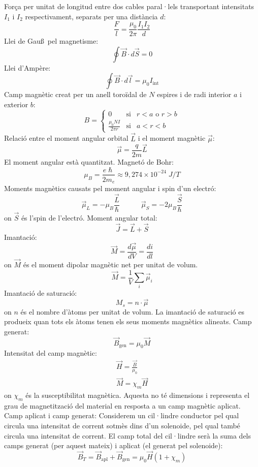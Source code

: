 \documentclass[../../../main.tex]{subfiles}
\begin{document}
\begin{multicols}{2}
\begin{itemize}
\end{itemize}
Força per unitat de longitud entre dos cables paral·lels transportant intensitats $I_1$ i $I_2$ res\-pec\-ti\-va\-ment, separats per una distància $d$: $$\frac{F}{l}=\frac{\mu_0}{2\pi}\frac{I_1I_2}{d}$$
Llei de Gau\ss\ pel magnetisme: $$\oint\Vec{B}\cdot d\Vec{S}=0$$
Llei d'Ampère: $$\oint\Vec{B}\cdot d\Vec{l}=\mu_0I_{\text{int}}$$
Camp magnètic creat per un anell toroïdal de $N$ espires i de radi interior $a$ i exterior $b$: $$B=\left\{
    \begin{array}{ccc}
    0 & \text{si} & r<a\text{ o }r>b \\
    \displaystyle\frac{\mu_0NI}{2\pi r} & \text{si} & a<r<b
    \end{array}\right.$$
Relació entre el moment angular orbital $\Vec{L}$ i el moment magnètic $\Vec{\mu}$: $$\Vec{\mu}=\frac{q}{2m}\Vec{L}$$
El moment angular està quantitzat.\newline
Magnetó de Bohr: $$\mu_B=\frac{e\hslash}{2m_e}\approx9,274\times10^{-24}\;J/T$$
Moments magnètics causats pel moment angular i spin d'un electró:
$$\Vec{\mu}_L=-\mu_B\frac{\Vec{L}}{\hslash}\quad\qquad\Vec{\mu}_S=-2\mu_B\frac{\Vec{S}}{\hslash}$$ {on $\Vec{S}$ és l'spin de l'electró.}\newline
Moment angular total: $$\Vec{J}=\Vec{L}+\Vec{S}$$
Imantació: $$\Vec{M}=\frac{d\Vec{\mu}}{dV}=\frac{di}{dl}$$ {on $\Vec{M}$ és el moment dipolar magnètic net per unitat de volum.}
$$\Vec{M}=\frac{1}{V}\sum_i\Vec{\mu}_i$$
Imantació de saturació: $$M_s=n\cdot\Vec{\mu}$$ {on $n$ és el nombre d'àtoms per unitat de volum.}\newline
La imantació de saturació es produeix quan tots els àtoms tenen els seus moments magnètics alineats.\newline
Camp generat:
$$\Vec{B}_{\text{gen}}=\mu_0\Vec{M}$$
Intensitat del camp magnètic: \begin{gather*}
\Vec{H}=\frac{\Vec{B}}{\mu_0}\\
\Vec{M}=\chi_m\Vec{H}
\end{gather*}
{on $\chi_m$ és la susceptibilitat magnètica. Aquesta no té dimensions i representa el grau de magnetització del material en resposta a un camp magnètic aplicat.}\newline
Camp aplicat i camp generat: Considerem un cil·lindre conductor pel qual circula una intensitat de corrent sotmès dins d'un solenoide, pel qual també circula una intensitat de corrent. El camp total del cil·lindre serà la suma dels camps generat (per aquest mateix) i aplicat (el generat pel solenoide): $$\Vec{B}_T=\Vec{B}_{\text{apl}}+\Vec{B}_{\text{gen}}=\mu_0\Vec{H}(1+\chi_m)$$

\end{multicols}
\end{document}
